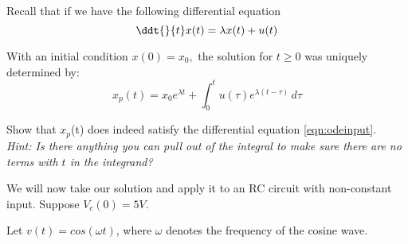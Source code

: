 

Recall that if we have the following differential equation
\begin{equation} \label{eqn:odeinput}
  \ddt{}{t} x(t) = \lambda x(t) + u(t)
\end{equation}

With an initial condition $x(0) = x_0,$ the solution for $t \geq 0$ was uniquely determined by:
\begin{equation} \label{eqn:odesol}
    x_{p}(t) = x_{0}e^{\lambda{}t} + \int_0^t \! u(\tau{})e^{\lambda{}(t - \tau{})} \, d\tau{}
\end{equation}

\begin{enumerate}

\qitem Show that $x_{p}$(t) does indeed satisfy the differential equation \eqref{eqn:odeinput}. \\
\textit{Hint: Is there anything you can pull out of the integral to make sure there are no terms with $t$ in the integrand?}


\end{enumerate}

We will now take our solution and apply it to an RC circuit with non-constant input. Suppose $V_{c}(0) = 5V$.

\begin{figure}[H]
 
\end{figure}
Let $v(t) = cos(\omega{}t)$, where $\omega{}$ denotes the frequency of the cosine wave.

